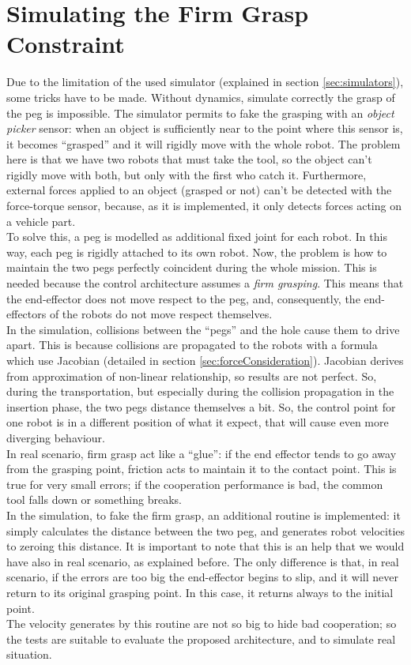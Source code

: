 \section{Simulating the Firm Grasp Constraint}
\label{sec:firmGrasp}
Due to the limitation of the used simulator (explained in section \ref{sec:simulators}), some tricks have to be made. Without dynamics, simulate correctly the grasp of the peg is impossible. The simulator permits to fake the grasping with an \textit{object picker} sensor: when an object is sufficiently near to the point where this sensor is, it becomes \enquote{grasped} and it will rigidly move with the whole robot. The problem here is that we have two robots that must take the tool, so the object can't rigidly move with both, but only with the first who catch it. Furthermore, external forces applied to an object (grasped or not) can't be detected with the force-torque sensor, because, as it is implemented, it only detects forces acting on a vehicle part.\\
To solve this, a peg is modelled as additional fixed joint for each robot. In this way, each peg is rigidly attached to its own robot. Now, the problem is how to maintain the two pegs perfectly coincident during the whole mission. This is needed because the control architecture assumes a \textit{firm grasping}. This means that the end-effector does not move respect to the peg, and, consequently, the end-effectors of the robots do not move respect themselves.\\
In the simulation, collisions between the \enquote{pegs} and the hole cause them to drive apart. This is because collisions are propagated to the robots with a formula which use Jacobian (detailed in section \ref{sec:forceConsideration}). Jacobian derives from approximation of non-linear relationship, so results are not perfect. So, during the transportation, but especially during the collision propagation in the insertion phase, the two pegs distance themselves a bit. So, the control point for one robot is in a different position of what it expect, that will cause even more diverging behaviour.\\
In real scenario, firm grasp act like a \enquote{glue}: if the end effector tends to go away from the grasping point, friction acts to maintain it to the contact point. This is true for very small errors; if the cooperation performance is bad, the common tool falls down or something breaks.\\
In the simulation, to fake the firm grasp, an additional routine is implemented: it simply calculates the distance between the two peg, and generates robot velocities to zeroing this distance. It is important to note that this is an help that we would have also in real scenario, as explained before. The only difference is that, in real scenario, if the errors are too big the end-effector begins to slip, and it will never return to its original grasping point. In this case, it returns always to the initial point. \\
The velocity generates by this routine are not so big to hide bad cooperation; so the tests are suitable to evaluate the proposed architecture, and to simulate real situation.

